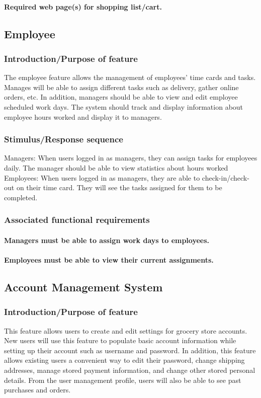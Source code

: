 \documentclass{scrreprt}
\begin{document}
\paragraph[]{\normalfont Required web page(s) for shopping list/cart.}

\subsection{Employee}
\subsubsection{Introduction/Purpose of feature}
The employee feature allows the management of employees’ time cards and tasks. Manages will be able to assign different tasks such as delivery, gather online orders, etc.  In addition, managers should be able to view and edit employee scheduled work days.  The system should track and display information about employee hours worked and display it to managers.


\subsubsection{Stimulus/Response sequence}
Managers:
When users logged in as managers, they can assign tasks for employees daily.  The manager should be able to view statistics about hours worked
Employees:
When users logged in as managers, they are able to check-in/check-out on their time card. They will see the tasks assigned for them to be completed.

\subsubsection{Associated functional requirements}
\paragraph[]{\normalfont Managers must be able to assign work days to employees.}
\paragraph[]{\normalfont Employees must be able to view their current assignments.}


\subsection{Account Management System}
\subsubsection{Introduction/Purpose of feature}
This feature allows users to create and edit settings for grocery store accounts.  New users will use this feature to populate basic account information while setting up their account such as username and password.  In addition, this feature allows existing users a convenient way to edit their password, change shipping addresses, manage stored payment information, and change other stored personal details.  From the user management profile, users will also be able to see past purchases and orders.
\end{document}

